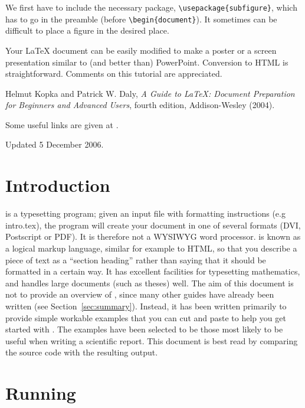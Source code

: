 \documentclass[12pt]{article}
\begin{document}
We first have to include the necessary package,
\verb+\usepackage{subfigure}+, which has to go in the preamble (before
\verb+\begin{document}+). It sometimes can be difficult to place a figure in
the desired place.

Your LaTeX document can be easily modified to make a poster or a screen
presentation similar to (and better than) PowerPoint. Conversion to HTML is
straightforward. Comments on this tutorial are appreciated.

\begin{thebibliography}{5}

  Helmut Kopka and Patrick W. Daly, \textsl{A Guide to
  \LaTeX: Document Preparation for Beginners and Advanced Users},
  fourth edition, Addison-Wesley (2004).

  Some useful links are
  given at \url{}.

\end{thebibliography}

{\small \noindent Updated 5 December 2006.}
\section{Introduction}

\latex is a typesetting program; given an input file with formatting
instructions (e.g intro.tex), the program will create your document in
one of several formats (DVI, Postscript or PDF).  It is therefore not
a WYSIWYG word processor.  \latex is known as a logical markup
language, similar for example to HTML, so that you describe a piece of
text as a ``section heading'' rather than saying that it should be
formatted in a certain way.  It has excellent facilities for
typesetting mathematics, and handles large documents (such as theses)
well.  The aim of this document is not to provide an overview of
\latex, since many other guides have already been written (see
Section~\ref{sec:summary}).  Instead, it has been written primarily to
provide simple workable examples that you can cut and paste to help
you get started with \latex.  The examples have been selected to be
those most likely to be useful when writing a scientific report.  This
document is best read by comparing the source code with the resulting
output.

\section{Running \latex}
\end{document}
